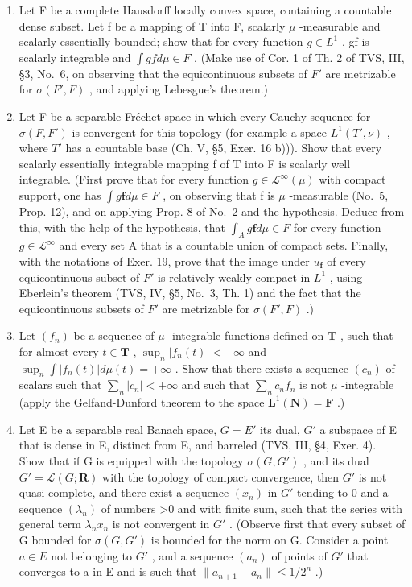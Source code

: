 \begin{enumerate}
\def\labelenumi{\arabic{enumi})}
\setcounter{enumi}{23}
\item
  Let F be a complete Hausdorff locally convex space, containing a countable dense subset. Let f be a mapping of T into F, scalarly \(\mu\) -measurable and scalarly essentially bounded; show that for every function \(g \in L^{1}\) , gf is scalarly integrable and \(\int g f d\mu \in F\) . (Make use of Cor. 1 of Th. 2 of TVS, III, §3, No.~6, on observing that the equicontinuous subsets of \(F'\) are metrizable for \(\sigma(F', F)\) , and applying Lebesgue's theorem.)
\item
  Let F be a separable Fréchet space in which every Cauchy sequence for \(\sigma(F, F')\) is convergent for this topology (for example a space \(L^1(T', \nu)\) , where \(T'\) has a countable base (Ch. V, §5, Exer. 16 b))). Show that every scalarly essentially integrable mapping f of T into F is scalarly well integrable. (First prove that for every function \(g \in \mathcal{L}^\infty(\mu)\) with compact support, one has \(\int g\mathbf{f} d\mu \in F\) , on observing that f is \(\mu\) -measurable (No.~5, Prop. 12), and on applying Prop. 8 of No.~2 and the hypothesis. Deduce from this, with the help of the hypothesis, that \(\int_A g\mathbf{f} d\mu \in F\) for every function \(g \in \mathcal{L}^\infty\) and every set A that is a countable union of compact sets. Finally, with the notations of Exer. 19, prove that the image under \(u_{\mathbf{f}}\) of every equicontinuous subset of \(F'\) is relatively weakly compact in \(L^1\) , using Eberlein's theorem (TVS, IV, §5, No.~3, Th. 1) and the fact that the equicontinuous subsets of \(F'\) are metrizable for \(\sigma(F', F)\) .)
\item
  Let \((f_n)\) be a sequence of \(\mu\) -integrable functions defined on \(\mathbf{T}\) , such that for almost every \(t \in \mathbf{T}\) , \(\sup_{n} |f_n(t)| < +\infty\) and \(\sup_{n} \int |f_n(t)| d\mu(t) = +\infty\) . Show that there exists a sequence \((c_n)\) of scalars such that \(\sum_{n} |c_n| < +\infty\) and such that \(\sum_{n} c_n f_n\) is not \(\mu\) -integrable (apply the Gelfand-Dunford theorem to the space \(\mathbf{L}^1(\mathbf{N}) = \mathbf{F}\) .)
\item
  Let E be a separable real Banach space, \(G = E'\) its dual, \(G'\) a subspace of E that is dense in E, distinct from E, and barreled (TVS, III, §4, Exer. 4). Show that if G is equipped with the topology \(\sigma(G, G')\) , and its dual \(G' = \mathcal{L}(G; \mathbf{R})\) with the topology of compact convergence, then \(G'\) is not quasi-complete, and there exist a sequence \((x_n)\) in \(G'\) tending to 0 and a sequence \((\lambda_n)\) of numbers \textgreater0 and with finite sum, such that the series with general term \(\lambda_n x_n\) is not convergent in \(G'\) . (Observe first that every subset of G bounded for \(\sigma(G, G')\) is bounded for the norm on G. Consider a point \(a \in E\) not belonging to \(G'\) , and a sequence \((a_n)\) of points of \(G'\) that converges to a in E and is such that \(\|a_{n+1} - a_n\| \leqslant 1/2^n\) .)
\end{enumerate}

